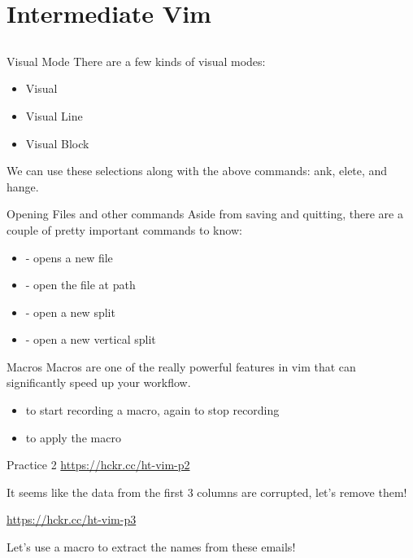 \documentclass[12pt]{beamer}
\begin{document}
\section{Intermediate Vim}
\subsection{}
\begin{frame}{Visual Mode}
    There are a few kinds of visual modes:
    \begin{itemize}
        \item Visual 
        \item Visual Line 
        \item Visual Block 
    \end{itemize}{}{}
    We can use these selections along with the above commands: ank, elete, and hange.
\end{frame}{}

\begin{frame}{Opening Files and other commands}
    Aside from saving and quitting, there are a couple of pretty important commands to know:
    \begin{itemize}
        \item {} - opens a new file
        \item {} - open the file at path
        \item {} - open a new split
        \item {} - open a new vertical split
    \end{itemize}{}
\end{frame}{}

\begin{frame}{Macros}
    Macros are one of the really powerful features in vim that can significantly speed up your workflow.
    \begin{itemize}
        \item {} to start recording a macro,  again to stop recording
        \item {} to apply the macro
    \end{itemize}{}

\end{frame}{}

\begin{frame}{Practice 2}
    \url{https://hckr.cc/ht-vim-p2}

    It seems like the data from the first 3 columns are corrupted, let's remove them!

    \url{https://hckr.cc/ht-vim-p3}

    Let's use a macro to extract the names from these emails!
\end{frame}{}
\end{document}
